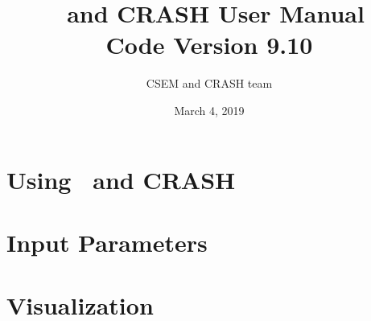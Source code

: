 \documentclass[twoside,10pt]{book}
\title{\BATSRUS\ and CRASH User Manual \\ \large Code Version 9.10}
\author{CSEM and CRASH team}
\date{March 4, 2019}
\begin{document}
\pagestyle{headings}

\maketitle

\tableofcontents



\chapter{Using \BATSRUS\ and CRASH \label{chapter:usage}}





\chapter{Input Parameters \label{chapter:param}}






\chapter{Visualization \label{chapter:visualization}}




%
\end{document}
